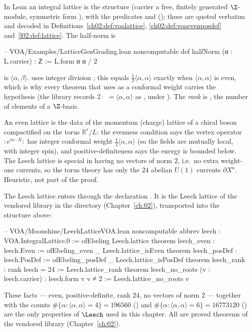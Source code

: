In Lean an integral lattice is the structure  (carrier a free, finitely
generated $\Z$-module, symmetric form ), with the predicates  and
 (); these are quoted verbatim and decoded in
Definitions~\ref{ch02:def:voalattice}, \ref{ch02:def:voaevenposdef} and~\ref{l02:def:lattice}.
The half-norm is
\begin{leancode}
-- VOA/Examples/LatticeGenGrading.lean
noncomputable def halfNorm (α : L.carrier) : ℤ := L.form α α / 2
\end{leancode}

\begin{dictionary}
 is $\langle\alpha,\beta\rangle$.  uses integer division
; this equals $\tfrac12\langle\alpha,\alpha\rangle$ exactly when $\langle\alpha,\alpha\rangle$
is even, which is why every theorem that uses  as a conformal weight carries the
hypothesis  (the library records $2\cdot$
$=\langle\alpha,\alpha\rangle$ as , under ). The \emph{rank}
 is , the number of elements of a $\Z$-basis.
\end{dictionary}

\begin{physics}
An even lattice is the data of the momentum (charge) lattice of a chiral boson compactified on the torus $\mathbb R^r/L$: the evenness condition says the vertex operator $:\!e^{i\alpha\cdot X}\!:$ has integer conformal weight $\tfrac12\langle\alpha,\alpha\rangle$ (so the fields are mutually local, with integer spin), and positive-definiteness says the energy is bounded below. The Leech lattice is special in having no vectors of norm $2$, i.e.\ no extra weight-one currents, so the torus theory has only the $24$ abelian $U(1)$ currents $\partial X^a$. Heuristic, not part of the proof.
\end{physics}

The Leech lattice enters through the declaration . It is the Leech
lattice of the vendored library in the directory 
(Chapter~\ref{ch:02}), transported into the structure above:
\begin{leancode}
-- VOA/Moonshine/LeechLatticeVOA.lean
noncomputable abbrev leech : VOA.IntegralLattice.{0} := ofEbeling Leech.lattice
theorem leech_even : leech.Even := ofEbeling_even _ Leech.lattice_isEven
theorem leech_posDef : leech.PosDef := ofEbeling_posDef _ Leech.lattice_isPosDef
theorem leech_rank : rank leech = 24 := Leech.lattice_rank
theorem leech_no_roots (v : leech.carrier) : leech.form v v ≠ 2 := Leech.lattice_no_roots v
\end{leancode}
These facts --- even, positive-definite, rank $24$, no vectors of norm $2$ --- together with the
counts $\#\{\alpha:\langle\alpha,\alpha\rangle=4\}=196560$ () and
$\#\{\alpha:\langle\alpha,\alpha\rangle=6\}=16773120$ () are the only
properties of $\Leech$ used in this chapter. All are proved theorems of the vendored library
(Chapter~\ref{ch:02}).


